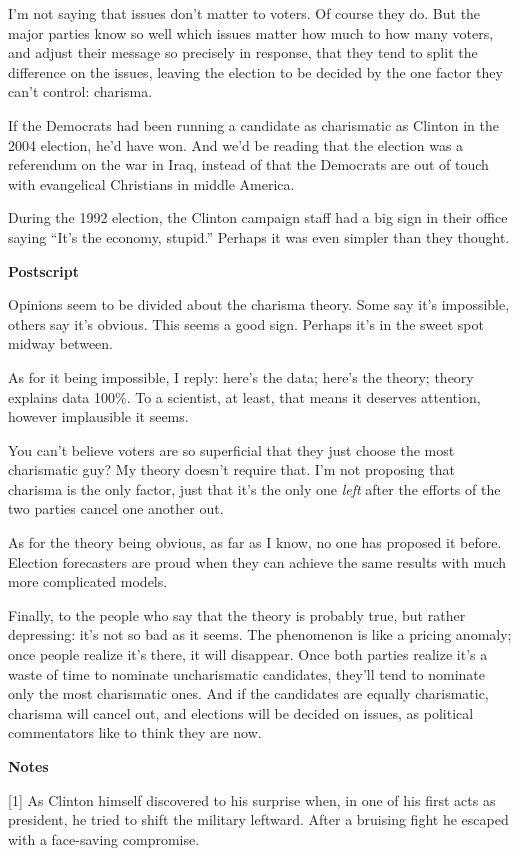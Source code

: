 I'm not saying that issues don't matter to voters. Of course they do.
But the major parties know so well which issues matter how much to how
many voters, and adjust their message so precisely in response, that
they tend to split the difference on the issues, leaving the election to
be decided by the one factor they can't control: charisma.

If the Democrats had been running a candidate as charismatic as Clinton
in the 2004 election, he'd have won. And we'd be reading that the
election was a referendum on the war in Iraq, instead of that the
Democrats are out of touch with evangelical Christians in middle
America.

During the 1992 election, the Clinton campaign staff had a big sign in
their office saying ``It's the economy, stupid.'' Perhaps it was even
simpler than they thought.

\textbf{Postscript}

Opinions seem to be divided about the charisma theory. Some say it's
impossible, others say it's obvious. This seems a good sign. Perhaps
it's in the sweet spot midway between.

As for it being impossible, I reply: here's the data; here's the theory;
theory explains data 100\%. To a scientist, at least, that means it
deserves attention, however implausible it seems.

You can't believe voters are so superficial that they just choose the
most charismatic guy? My theory doesn't require that. I'm not proposing
that charisma is the only factor, just that it's the only one
\emph{left} after the efforts of the two parties cancel one another out.

As for the theory being obvious, as far as I know, no one has proposed
it before. Election forecasters are proud when they can achieve the same
results with much more complicated models.

Finally, to the people who say that the theory is probably true, but
rather depressing: it's not so bad as it seems. The phenomenon is like a
pricing anomaly; once people realize it's there, it will disappear. Once
both parties realize it's a waste of time to nominate uncharismatic
candidates, they'll tend to nominate only the most charismatic ones. And
if the candidates are equally charismatic, charisma will cancel out, and
elections will be decided on issues, as political commentators like to
think they are now.

\textbf{Notes}

{[}1{]} As Clinton himself discovered to his surprise when, in one of
his first acts as president, he tried to shift the military leftward.
After a bruising fight he escaped with a face-saving compromise.


